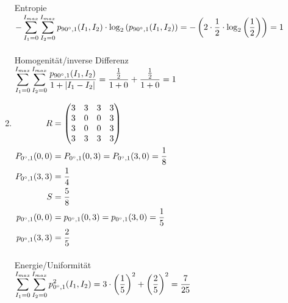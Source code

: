 \begin{enumerate}[I]
	      Entropie\\
	      $\begin{aligned}[t]
			      -  \sum_{I_1=0}^{I_{max}}\sum_{I_2=0}^{I_{max}}  p_{90\degree,1}(I_1,I_2) \cdot \log_2 \left( p_{90\degree,1}(I_1,I_2) \right)
			      =- \left(2 \cdot \frac{1}{2} \cdot \log_2\left(\frac{1}{2}\right) \right) = 1 \\
		      \end{aligned}$\\\\

	      Homogenität/inverse Differenz\\
	      $\begin{aligned}[t]
			      \sum_{I_1=0}^{I_{max}}\sum_{I_2=0}^{I_{max}}  \frac{p_{90\degree,1}(I_1,I_2)}{1 + |I_1-I_2|}
			      = \frac{\frac{1}{2}}{1 + 0} + \frac{\frac{1}{2}}{1 + 0} = 1 \\
		      \end{aligned}$
	      \newpage
	\item $\begin{aligned}[t]
			      R                   & = \begin{pmatrix}
				                              3 & 3 & 3 & 3 \\
				                              3 & 0 & 0 & 3 \\
				                              3 & 0 & 0 & 3 \\
				                              3 & 3 & 3 & 3 \\
			                              \end{pmatrix} \\
			      P_{0\degree,1}(0,0) & =
			      P_{0\degree,1}(0,3)  =
			      P_{0\degree,1}(3,0)  = \frac{1}{8}     \\
			      P_{0\degree,1}(3,3) & = \frac{1}{4}    \\
			      S                   & = \frac{5}{8}    \\
			      p_{0\degree,1}(0,0) & =
			      p_{0\degree,1}(0,3)  =
			      p_{0\degree,1}(3,0)  = \frac{1}{5}     \\
			      p_{0\degree,1}(3,3) & = \frac{2}{5}    \\
		      \end{aligned}$\\\\

	      Energie/Uniformität\\
	      $\begin{aligned}[t]
			      \sum_{I_1=0}^{I_{max}}\sum_{I_2=0}^{I_{max}} p^2_{0\degree,1}(I_1,I_2)
			      = 3 \cdot \left(\frac{1}{5}\right)^2 + \left(\frac{2}{5}\right)^2  = \frac{7}{25} \\
		      \end{aligned}$\\\\


\end{enumerate}
